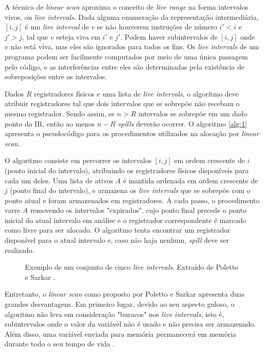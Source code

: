 \documentclass[
	12pt,				%
	openright,			%
	oneside,			%
	a4paper,			%
	tccpreliminar,			%
	]{ABNT-DC-UEL}
\begin{document}
A técnica de \textit{linear scan} aproxima o conceito de \textit{live range} na forma intervalos vivos, ou \textit{live intervals}. Dada alguma enumeração da representação intermediária, $[i,j]$ é um \textit{live interval} de $v$ se não houverem instruções de número $i'<i$ e $j'>j$, tal que $v$ esteja viva em $i'$ e $j'$. Podem haver subintervalos de $[i,j]$ onde $v$ não está viva, mas eles são ignorados para todos os fins. Os \textit{live intervals} de um programa podem ser facilmente computados por meio de uma única passagem pelo código, e as interferências entre eles são determinadas pela existência de sobreposições entre os intervalos. 

Dados $R$ registradores físicos e uma lista de \textit{live intervals}, o algoritmo deve atribuir registradores tal que dois intervalos que se sobrepõe não recebam o mesmo registrador. Sendo assim, se $n>R$ intervalos se sobrepõe em um dado ponto da IR, então ao menos $n-R$ \textit{spills} deverão ocorrer. O algoritmo \ref{alg:1} apresenta o pseudocódigo para os procedimentos utilizados na alocação por \textit{linear scan}.

O algoritmo consiste em percorrer os intervalos $[i,j]$ em ordem crescente de $i$ (ponto inicial do intervalo), atribuindo os registradores físicos disponíveis para cada um deles. Uma lista de ativos $A$ é mantida ordenada em ordem crescente de $j$ (ponto final do intervalo), e armazena os \textit{live intervals} que se sobrepõe com o ponto atual e foram armazenados em registradores. A cada passo, o procedimento varre $A$ removendo os intervalos "expirados", cujo ponto final precede o ponto inicial do atual intervalo em análise e o registrador correspondente é marcado como livre para ser alocado. O algoritmo tenta encontrar um registrador disponível para o atual intervalo e, caso não haja nenhum, \textit{spill} deve ser realizado.

\begin{figure}
    \centering
    
    \caption{Exemplo de um conjunto de cinco \textit{live intervals}. Extraído de Poletto e Sarkar \cite{poletto:99}.}
    \label{fig:linearscan}
\end{figure}

Entretanto, o \textit{linear scan} como proposto por Poletto e Sarkar apresenta duas grandes desvantagens. Em primeiro lugar, devido ao seu aspecto guloso, o algoritmo não leva em consideração "buracos" nos \textit{live intervals}, isto é, subintervalos onde o valor da variável não é usado e não precisa ser armazenado. Além disso, uma variável enviada para memória permanecerá em memória durante todo o seu tempo de vida \cite{eisl:16}.
\end{document}
